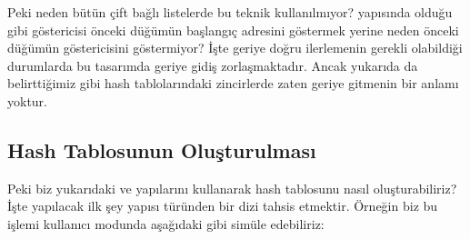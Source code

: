 \documentclass[a4paper,10pt,turkish]{sphinxmanual}
\begin{document}
\sphinxAtStartPar
Peki neden bütün çift bağlı listelerde bu teknik kullanılmıyor?  yapısında
olduğu gibi  göstericisi önceki düğümün başlangıç adresini göstermek yerine neden
önceki düğümün  göstericisini göstermiyor? İşte geriye doğru ilerlemenin gerekli
olabildiği durumlarda bu tasarımda geriye gidiş zorlaşmaktadır. Ancak yukarıda da
belirttiğimiz gibi hash tablolarındaki zincirlerde zaten geriye gitmenin bir anlamı yoktur.


\subsection{Hash Tablosunun Oluşturulması}
\label{\detokenize{kernellinkedlistandhashtable:hash-tablosunun-olusturulmasi}}
\sphinxAtStartPar
Peki biz yukarıdaki  ve  yapılarını kullanarak hash tablosunu
nasıl oluşturabiliriz? İşte yapılacak ilk şey  yapısı türünden bir dizi tahsis
etmektir. Örneğin biz bu işlemi kullanıcı modunda aşağıdaki gibi simüle edebiliriz:
\end{document}
